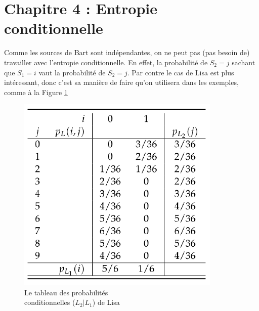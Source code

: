 \documentclass[11pt,a4paper]{article}
\renewcommand{\)}{\right)}
\renewcommand{\(}{\left(}
\begin{document}
\section[Entropie conditionnelle]{Chapitre 4 : Entropie conditionnelle}
\begin{exemple}
	Comme les sources de Bart sont indépendantes, on ne peut pas (pas besoin de) travailler avec l'entropie conditionnelle. En effet, la probabilité de $S_2 = j$ sachant que $S_1 = i$ vaut la probabilité de $S_2 = j$. Par contre le cas de Lisa est plus intéressant, donc c'est sa manière de faire qu'on utilisera dans les exemples, comme à la Figure \ref{conditionnel lisa}
\end{exemple}
\begin{figure}[!h]
	\centering
	\includegraphics[scale=0.5]{images/entropie_conditionnelle_lisa}
	\caption{Le tableau des probabilités\\ conditionnelles ($L_2|L_1$) de Lisa}
	\label{conditionnel lisa}
\end{figure}
\begin{center}
\end{center}
\end{document}
